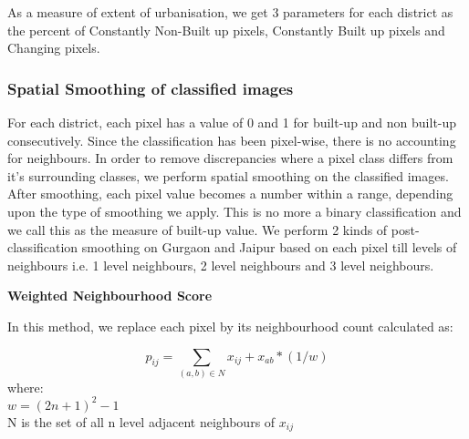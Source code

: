 As a measure of extent of urbanisation, we get 3 parameters for each district as the percent of Constantly Non-Built up pixels, Constantly Built up pixels and Changing pixels. 

\newcommand{\temporal}[5] {
	\begin{figure}[H]
		\begin{subfigure}[b]{0.6\textwidth}
			\centering
			\resizebox{45mm}{!} {\includegraphics *{images/temporal/#1/#214.png}}
			\resizebox{45mm}{!} {\includegraphics *{images/temporal/#1/#215.png}}
			\resizebox{45mm}{!} {\includegraphics *{images/temporal/#1/#217.png}}
			\resizebox{45mm}{!} {\includegraphics *{images/temporal/#1/#218.png}}
		\end{subfigure}
		\hfill
		\begin{subfigure}[b]{0.4\textwidth}
			\centering
			\resizebox{60mm}{!} {\includegraphics *{images/temporal/#1/#2cdf.png}}
		\end{subfigure}
		\caption {#3: After spatial smoothing using #4-level #5 (a) Classified results (b) CDF plot}
	\end{figure}
}

\subsubsection{Spatial Smoothing of classified images}
\label{method:extentofchangespatialsmoothing}

For each district, each pixel has a value of 0 and 1 for built-up and non built-up consecutively. Since the classification has been pixel-wise, there is no accounting for neighbours. In order to remove discrepancies where a pixel class differs from it's surrounding classes, we perform spatial smoothing on the classified images. After smoothing, each pixel value becomes a number within a range, depending upon the type of smoothing we apply. This is no more a binary classification and we call this as the measure of built-up value. We perform 2 kinds of post-classification smoothing on Gurgaon and Jaipur based on each pixel till levels of neighbours i.e. 1 level neighbours, 2 level neighbours and 3 level neighbours.

\noindent \textbf{Weighted Neighbourhood Score}

In this method, we replace each pixel by its neighbourhood count calculated as:

\[p_{ij} = \sum_{(a,b) \in N}x_{ij} + x_{ab}*(1/w)\]
where:\\
$w = (2n+1)^{2}-1$ \\
N is the set of all n level adjacent neighbours of $x_{ij}$

